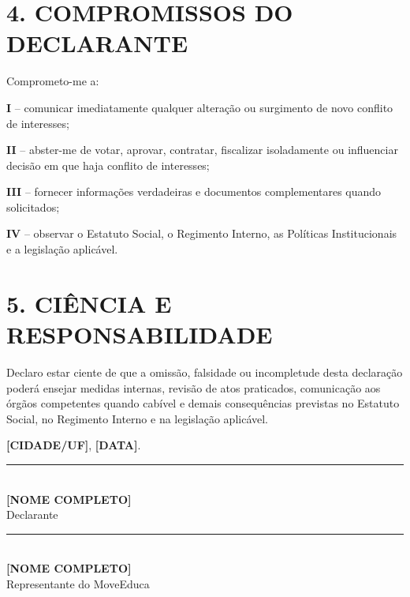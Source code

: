 \documentclass[11pt,a4paper]{article}
\begin{document}
\vspace{4cm}

\section*{4. COMPROMISSOS DO DECLARANTE}

Comprometo-me a:

\textbf{I} -- comunicar imediatamente qualquer alteração ou surgimento de novo conflito de interesses;

\textbf{II} -- abster-me de votar, aprovar, contratar, fiscalizar isoladamente ou influenciar decisão em que haja conflito de interesses;

\textbf{III} -- fornecer informações verdadeiras e documentos complementares quando solicitados;

\textbf{IV} -- observar o Estatuto Social, o Regimento Interno, as Políticas Institucionais e a legislação aplicável.

\section*{5. CIÊNCIA E RESPONSABILIDADE}

Declaro estar ciente de que a omissão, falsidade ou incompletude desta declaração poderá ensejar medidas internas, revisão de atos praticados, comunicação aos órgãos competentes quando cabível e demais consequências previstas no Estatuto Social, no Regimento Interno e na legislação aplicável.

\vspace{2cm}
\begin{center}
\textbf{[CIDADE/UF]}, \textbf{[DATA]}.

\vspace{2cm}
\rule{8cm}{0.4pt}\\
\textbf{[NOME COMPLETO]}\\
Declarante

\vspace{1.5cm}
\rule{8cm}{0.4pt}\\
\textbf{[NOME COMPLETO]}\\
Representante do MoveEduca
\end{center}
\end{document}
